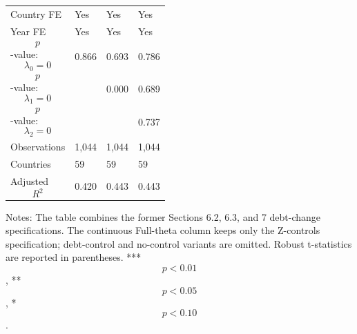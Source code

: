 \begin{table}[H]
\begin{threeparttable}
\begin{tabularx}{\textwidth}{lYYY}
Country FE & Yes & Yes & Yes \\
Year FE & Yes & Yes & Yes \\
$$p$$-value: $$\lambda_0=0$$ & 0.866 & 0.693 & 0.786 \\
$$p$$-value: $$\lambda_1=0$$ &  & 0.000 & 0.689 \\
$$p$$-value: $$\lambda_2=0$$ &  &  & 0.737 \\
Observations & 1,044 & 1,044 & 1,044 \\
Countries & 59 & 59 & 59 \\
Adjusted $$R^2$$ & 0.420 & 0.443 & 0.443 \\
\bottomrule
\end{tabularx}
\begin{tablenotes}[flushleft]\footnotesize
\item Notes: The table combines the former Sections 6.2, 6.3, and 7 debt-change specifications. The continuous Full-theta column keeps only the Z-controls specification; debt-control and no-control variants are omitted. Robust t-statistics are reported in parentheses. *** $$p<0.01$$, ** $$p<0.05$$, * $$p<0.10$$.
\end{tablenotes}
\end{threeparttable}
\end{table}
